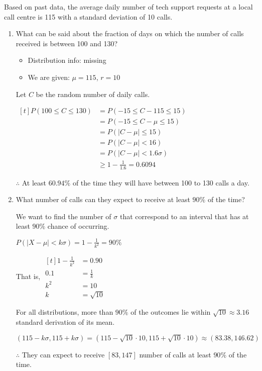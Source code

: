 \begin{example}
    Based on past data, the average daily number of tech support requests at a local call centre is 115 with a standard deviation of 10 calls.

    \begin{enumerate}[label=\alph*)]
        \item What can be said about the fraction of days on which the number of calls received is between 100 and 130?
        
        \begin{itemize}
            \item Distribution info: missing 
            \item We are given: $\mu = 115$, $r = 10$
        \end{itemize}

        Let $C$ be the random number of daily calls. 

        $\begin{aligned}[t]
            P(100 \le C \le 130) & = P(-15 \le C - 115 \le 15) \\
                                 & = P(-15 \le C - \mu \le 15) \\
                                 & = P(|C - \mu| \le 15) \\
                                 & = P(|C - \mu| < 16) \\
                                 & = P(|C - \mu| < 1.6\sigma) \\
                                 & \ge 1 - \frac{1}{1.6} = 0.6094
        \end{aligned}$

        $\therefore$ At least $60.94\%$ of the time they will have between 100 to 130 calls a day. 

        \item What number of calls can they expect to receive at least $90\%$ of the time?

        We want to find the number of $\sigma$ that correspond to an interval that has at least $90\%$ chance of occurring. 
        
        $P(|X - \mu| < k\sigma) = 1 - \frac{1}{k^2} = 90\%$

        That is, $\begin{aligned}[t]
            1 - \frac{1}{k^2} & = 0.90        \\
            0.1               & = \frac{1}{k} \\
            k^2               & = 10          \\
            k                 & = \sqrt{10}
        \end{aligned}$

        For all distributions, more than $90\%$ of the outcomes lie within $\sqrt{10} \approx 3.16$ standard derivation of its mean. 

        $(115 - k\sigma, 115 + k\sigma) = (115 - \sqrt{10} \cdot 10, 115 + \sqrt{10} \cdot 10) \approx (83.38, 146.62)$

        $\therefore$ They can expect to receive $[83, 147]$ number of calls at least $90\%$ of the time. 
    \end{enumerate}
\end{example}

